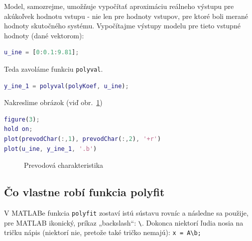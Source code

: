 \documentclass[a4paper, 10pt, ]{article}
\begin{document}
Model, samozrejme, umožňuje vypočítať aproximáciu reálneho výstupu pre akúkoľvek hodnotu vstupu - nie len pre hodnoty vstupov, pre ktoré boli merané hodnoty skutočného systému. Vypočítajme výstupy modelu pre tieto vstupné hodnoty (dané vektorom):
\begin{lstlisting}[language=Matlab,]
u_ine = [0:0.1:9.81];
\end{lstlisting}
Teda zavoláme funkciu \verb|polyval|.
\begin{lstlisting}[language=Matlab,]
y_ine_1 = polyval(polyKoef, u_ine);
\end{lstlisting}
Nakreslime obrázok (viď obr.~\ref{Prevodová charakteristika nuine})
\begin{lstlisting}[language=Matlab,]
figure(3);
hold on;
plot(prevodChar(:,1), prevodChar(:,2), '+r')
plot(u_ine, y_ine_1, '.b')
\end{lstlisting}




\begin{figure}[!ht]
	\centering


    \vspace{-4mm}

	\caption{Prevodová charakteristika}
	\label{Prevodová charakteristika nuine}

\end{figure}









\subsection{Čo vlastne robí funkcia polyfit}

V MATLABe funkcia \verb|polyfit| zostaví istú sústavu rovníc a následne sa použije, pre MATLAB ikonický, príkaz „backslash“: \verb|\|. Dokonca niektorí ľudia nosia na tričku nápis (niektorí nie, pretože také tričko nemajú): \verb|x = A\b;|
\end{document}
